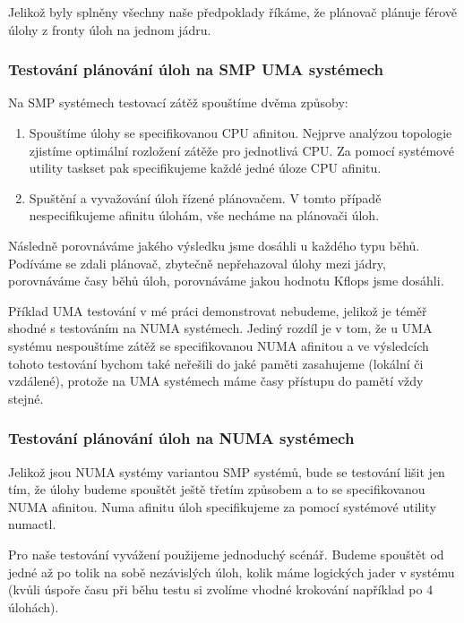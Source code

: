 \documentclass[
  master=true,
  font=sans,
  printversion=false,
  joinlists=true,
  figures=true,
  tables=true,
  sourcecodes=false,
  theorems=false,
  bibencoding=utf8,
  language=czech,
  encoding=utf8,
  field=ainfk,
  biblatex,
  glossaries,
  index
]{kidiplom}
\begin{document}
Jelikož byly splněny všechny naše předpoklady říkáme, že plánovač plánuje férově úlohy z fronty úloh na jednom jádru.

\subsubsection{Testování plánování úloh na SMP UMA systémech}
\label{testovani SMP UMA}

\noindent
Na SMP systémech testovací zátěž spouštíme dvěma způsoby:
\begin{enumerate}
\item Spouštíme úlohy se specifikovanou CPU afinitou. Nejprve analýzou topologie zjistíme optimální rozložení zátěže pro jednotlivá CPU. Za pomocí systémové utility taskset pak specifikujeme každé jedné úloze CPU afinitu.  
\item Spuštění a vyvažování úloh řízené plánovačem. V tomto případě nespecifikujeme afinitu úlohám, vše necháme na plánovači úloh.
\end{enumerate}

Následně porovnáváme jakého výsledku jsme dosáhli u každého typu běhů. Podíváme se zdali plánovač, zbytečně nepřehazoval úlohy mezi jádry, porovnáváme časy běhů úloh, porovnáváme jakou hodnotu Kflops jsme dosáhli.\newline

Příklad UMA testování v mé práci demonstrovat nebudeme, jelikož je téměř shodné s testováním na NUMA systémech. Jediný rozdíl je v tom, že u UMA systému nespouštíme zátěž se specifikovanou NUMA afinitou a ve výsledcích tohoto testování bychom také neřešili do jaké paměti zasahujeme (lokální či vzdálené), protože na UMA systémech máme časy přístupu do pamětí vždy stejné. 

\subsubsection{Testování plánování úloh na NUMA systémech}
\label{testovani NUMA}

Jelikož jsou NUMA systémy variantou SMP systémů, bude se testování lišit jen tím, že úlohy budeme spouštět ještě třetím způsobem a to se specifikovanou NUMA afinitou. Numa afinitu úloh specifikujeme za pomocí systémové utility numactl.


Pro naše testování vyvážení použijeme jednoduchý scénář. Budeme spouštět od jedné až po tolik na sobě nezávislých úloh, kolik máme logických jader v systému (kvůli úspoře času při běhu testu si zvolíme vhodné krokování například po 4 úlohách). 
\end{document}
